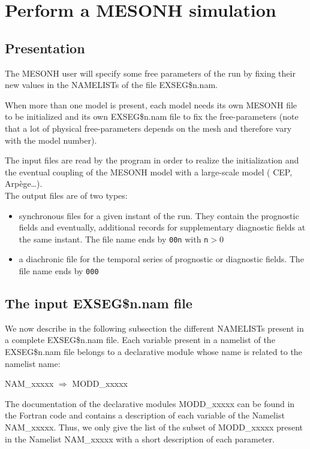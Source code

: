 \chapter{ Perform a MESONH simulation} \label{ch:model}


\section{Presentation}

The MESONH user will  
specify some free parameters of the run by fixing their new values in the
NAMELISTs of the file EXSEG\$n.nam. 

When more than one model is present, each model needs its own MESONH file to be
initialized and its own EXSEG\$n.nam file to fix the free-parameters (note that a lot
of physical free-parameters depends on the mesh and therefore vary with the
model number). 

The input files are read by the program in order to realize the initialization and
the eventual coupling of the
MESONH model with a large-scale model ( CEP, Arp\`ege\ldots). \\

The output files are of two types:
\begin{itemize}
\item
synchronous files for a given instant of the run. They contain the prognostic
fields and  eventually,
additional records for supplementary diagnostic  fields at the same instant.
The file name ends by {\tt 00n} with {\tt n}$>$0
\item
a diachronic file for the temporal series of prognostic or diagnostic fields.
The file name ends by {\tt 000}
\end{itemize}

\section{The input EXSEG\$n.nam file}
We now describe in the following subsection the different NAMELISTs present in 
a complete EXSEG\$n.nam file. 
Each variable present in a namelist of the EXSEG\$n.nam file
belongs to a declarative module whose name is related to the namelist name:

NAM\_xxxxx    $\Longrightarrow $ MODD\_xxxxx

The documentation of the
declarative modules  MODD\_xxxxx can be found in the Fortran code and contains 
a description of each variable of the Namelist NAM\_xxxxx. Thus, we 
only give the list of the subset of MODD\_xxxxx present in the Namelist  
NAM\_xxxxx with a short description of each parameter.


